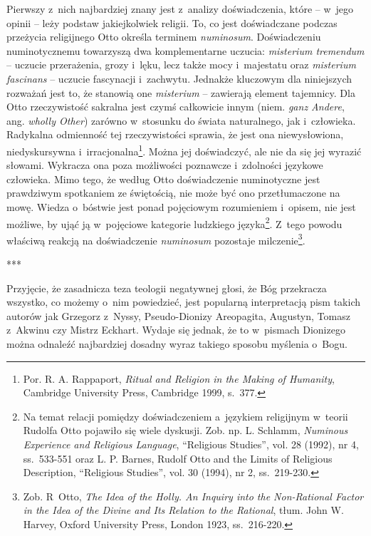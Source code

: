 Pierwszy z~nich najbardziej znany jest z~analizy doświadczenia, które -- w~jego opinii -- leży podstaw jakiejkolwiek religii. To, co jest doświadczane podczas przeżycia religijnego Otto określa terminem \textit{numinosum}. Doświadczeniu numinotycznemu towarzyszą dwa komplementarne uczucia: \textit{misterium tremendum} -- uczucie przerażenia, grozy i~lęku, lecz także mocy i~majestatu oraz \textit{misterium fascinans}\- -- uczucie fascynacji i~zachwytu. Jednakże kluczowym dla niniejszych rozważań jest to, że stanowią one \textit{misterium} -- zawierają element tajemnicy. Dla Otto rzeczywistość sakralna jest czymś całkowicie innym (niem. \textit{ganz Andere}, ang. \textit{wholly Other}) zarówno w~stosunku do świata naturalnego, jak i~człowieka. Radykalna odmienność tej rzeczywistości sprawia, że jest ona niewysłowiona, niedyskursywna i~irracjonalna\footnote{Por. R. A. Rappaport, \textit{Ritual and Religion in the Making of Humanity}, Cambridge University Press, Cambridge 1999, s.~377.}. Można jej doświadczyć, ale nie da się jej wyrazić słowami. Wykracza ona poza możliwości poznawcze i~zdolności językowe człowieka. Mimo tego, że według Otto doświadczenie numinotyczne jest prawdziwym spotkaniem ze świętością, nie może być ono przetłumaczone na mowę. Wiedza o~bóstwie jest ponad pojęciowym rozumieniem i~opisem, nie jest możliwe, by ująć ją w~pojęciowe kategorie ludzkiego języka\footnote{Na temat relacji pomiędzy doświadczeniem a~językiem religijnym w~teorii Rudolfa Otto pojawiło się wiele dyskusji. Zob. np. L. Schlamm, \textit{Numinous Experience and Religious Language}, ``Religious Studies'', vol. 28 (1992), nr 4, ss.~533-551 oraz L. P. Barnes, Rudolf Otto and the Limits of Religious Description, ``Religious Studies'', vol. 30 (1994), nr 2, ss.~219-230.}. Z~tego powodu właściwą reakcją na doświadczenie \textit{numinosum} pozostaje milczenie\footnote{Zob. R~Otto, \textit{The Idea of the Holly. An Inquiry into the Non-Rational Factor in the Idea of the Divine and Its Relation to the Rational}, tłum. John W. Harvey, Oxford University Press, London 1923, ss.~216-220.}.

***

Przyjęcie, że zasadnicza teza teologii negatywnej głosi, że Bóg przekracza wszystko, co możemy o~nim powiedzieć, jest popularną interpretacją pism takich autorów jak Grzegorz z~Nyssy, Pseudo-Dionizy Areopagita, Augustyn, Tomasz z~Akwinu czy Mistrz Eckhart. Wydaje się jednak, że to w~pismach Dionizego można odnaleźć najbardziej dosadny wyraz takiego sposobu myślenia o~Bogu.


